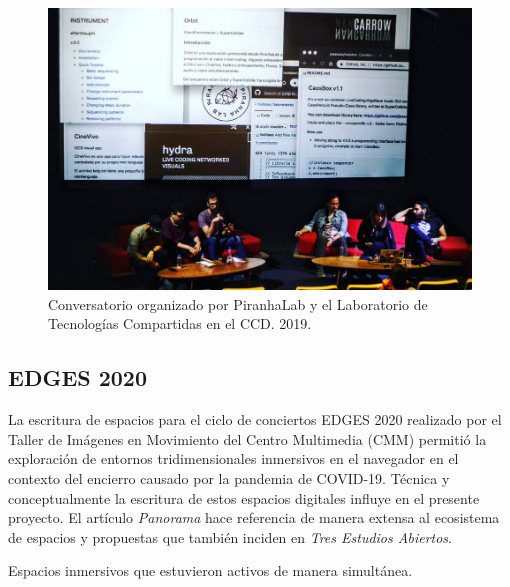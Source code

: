 \begin{figure}[tb]
\centering 
\includegraphics[width=\columnwidth]{../../img/conversatorio.jpg} 
\caption[Conversatorio CCD]{Conversatorio organizado por PiranhaLab y el Laboratorio de Tecnologías Compartidas en el CCD. 2019.} %
\label{fig:gallery} 
\end{figure}

\subsection{EDGES 2020}

La escritura de espacios para el ciclo de conciertos EDGES 2020 realizado por el Taller de Imágenes en Movimiento del Centro Multimedia (CMM) permitió la exploración de entornos tridimensionales inmersivos en el navegador en el contexto del encierro causado por la pandemia de COVID-19. Técnica y conceptualmente la escritura de estos espacios digitales influye en el presente proyecto. El artículo \textit{Panorama} \citep{panoramaArticulo} hace referencia de manera extensa al ecosistema de espacios y propuestas que también inciden en \textit{Tres Estudios Abiertos}.


Espacios inmersivos que estuvieron activos de manera simultánea. 

\printendnotes
